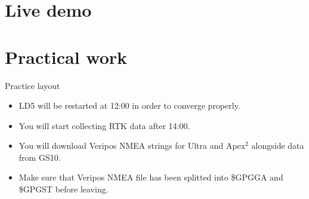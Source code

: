 \documentclass[11pt]{beamer}
\begin{document}
\section{Live demo}



\section{Practical work}

\begin{frame}{Practice layout}
	
	\begin{itemize}
		\item LD5 will be restarted at 12:00 in order to converge properly.
		\item You will start collecting RTK data after 14:00. 
		\item You will download Veripos NMEA strings for Ultra and Apex$^2$ alongside data from GS10.
		\item Make sure that Veripos NMEA file has been splitted into \$GPGGA and \$GPGST before leaving.
	\end{itemize}

\end{frame}
\end{document}
